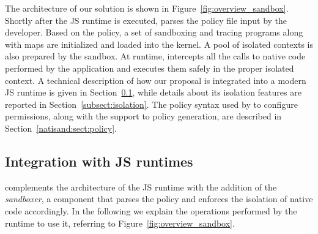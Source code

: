 The architecture of our solution is shown in
Figure~\ref{fig:overview_sandbox}. Shortly after the JS runtime is
executed, \pap parses the policy file input by the developer. Based on
the policy, a set of sandboxing and tracing programs
%
along with maps
%
are initialized and loaded into the kernel. A pool of isolated
contexts is also prepared by the sandbox. At runtime, \pap intercepts
all the calls to native code performed by the application and executes
them safely in the proper isolated context.
%
A technical description of how our proposal is integrated into a
modern JS runtime is given in Section~\ref{subsect:arch}, while
details about its isolation features are reported in
Section~\ref{subsect:isolation}. The policy syntax used by \pap to
configure permissions, along with the support to policy
generation, are described in Section~\ref{natisand:sect:policy}.


\subsection{Integration with JS runtimes}
\label{subsect:arch}

\pap complements the architecture of the JS runtime with the addition
of the {\em sandboxer}, a component that parses the policy and
enforces the isolation of native code accordingly. In the following we
explain the operations performed by the runtime to use it, referring to Figure~\ref{fig:overview_sandbox}.

